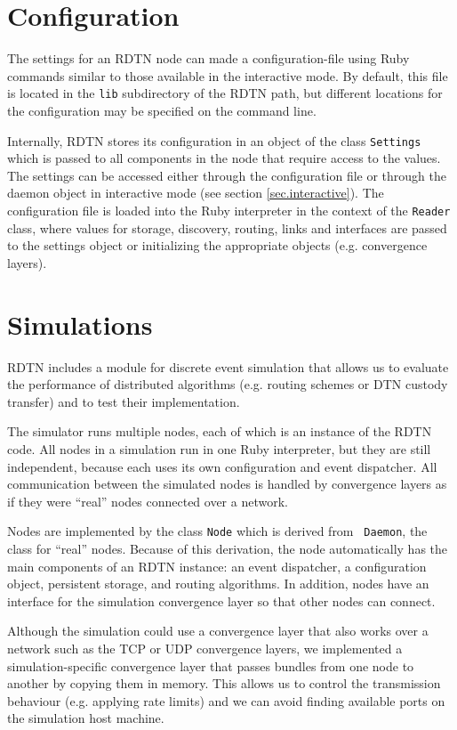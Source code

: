 \documentclass[a4paper]{article}
\begin{document}
\section{Configuration}\label{sec.config}

The settings for an RDTN node can made a configuration-file using Ruby commands
similar to those available in the interactive mode. By default, this file is
located in the {\tt lib} subdirectory of the RDTN path, but different locations
for the configuration may be specified on the command line.

Internally, RDTN stores its configuration in an object of the class
{\tt Settings} which is passed to all components in the node that require
access to the values. The settings can be accessed either through the
configuration file or through the daemon object in interactive mode (see section
\ref{sec.interactive}). The configuration file is loaded into the Ruby
interpreter in the context of the {\tt Reader} class, where values for
storage, discovery, routing, links and interfaces are passed to the settings
object or initializing the appropriate objects (e.g. convergence layers).

\section{Simulations}\label{sec.sim}

RDTN includes a module for discrete event simulation that allows us to evaluate
the performance of distributed algorithms (e.g.  routing schemes or DTN custody
transfer) and to test their implementation.

The simulator runs multiple nodes, each of which is an instance of the RDTN
code. All nodes in a simulation run in one Ruby interpreter, but they are still
independent, because each uses its own configuration and event dispatcher. All
communication between the simulated nodes is handled by convergence layers
as if they were ``real'' nodes connected over a network.

Nodes are implemented by the class {\tt Node} which is derived from {\tt
Daemon}, the class for ``real'' nodes. Because of this derivation, the node
automatically has the main components of an RDTN instance: an event dispatcher,
a configuration object, persistent storage, and routing algorithms. In addition,
nodes have an interface for the simulation convergence layer so that other nodes
can connect.

Although the simulation could use a convergence layer that also works over a
network such as the TCP or UDP convergence layers, we implemented a
simulation-specific convergence layer that passes bundles from one node to
another by copying them in memory. This allows us to control the transmission
behaviour (e.g. applying rate limits) and we can avoid finding available ports
on the simulation host machine. 
\end{document}
